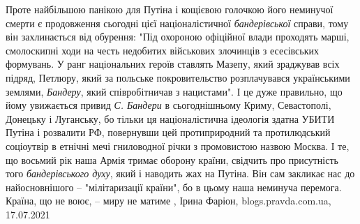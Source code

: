 Проте найбільшою панікою для Путіна і кощієвою голочкою його неминучої смерти є
продовження сьогодні цієї націоналістичної \emph{бандерівської} справи, тому він
захлинається від обурення: "Під охороною офіційної влади проходять марші,
смолоскипні ходи на честь недобитих військових злочинців з есесівських
формувань. У ранг національних героїв ставлять Мазепу, який зраджував всіх
підряд, Петлюру, який за польське покровительство розплачувався українськими
землями, \emph{Бандеру}, який співробітничав з нацистами". І це дуже правильно, що
йому увижається привид \emph{С. Бандери} в сьогоднішньому Криму, Севастополі, Донецьку
і Луганську, бо тільки ця націоналістична ідеологія здатна УБИТИ Путіна і
розвалити РФ, повернувши цей протиприродний та протилюдський соціоутвір в
етнічні мечі гниловодної річки з промовистою назвою Москва. І те, що восьмий
рік наша Армія тримає оборону країни, свідчить про присутність того
\emph{бандерівського духу}, який і наводить жах на Путіна. Він сам закликає нас до
найосновнішого – "мілітаризації країни", бо в цьому наша неминуча перемога.
Країна, що не воює, – миру не матиме
, 
Ірина Фаріон, blogs.pravda.com.ua, 17.07.2021


